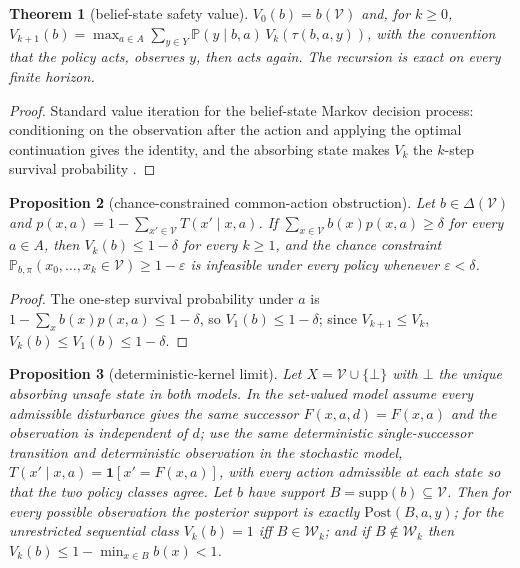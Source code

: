 \documentclass[11pt,a4paper]{article}
\theoremstyle{plain}
\newtheorem{theorem}{Theorem}[section]
\newtheorem{proposition}[theorem]{Proposition}
\theoremstyle{definition}
\theoremstyle{remark}
\newcommand{\cV}{\mathcal{V}}
\newcommand{\cW}{\mathcal{W}}
\newcommand{\Post}{\mathrm{Post}}
\newcommand{\supp}{\mathrm{supp}}
\begin{document}
\begin{theorem}[belief-state safety value]\label{thm:pomdp}
$V_0(b)=b(\cV)$ and, for $k\ge0$, $V_{k+1}(b)=\max_{a\in A}\sum_{y\in Y}\mathbb P(y\mid b,a)\,V_k(\tau(b,a,y))$, with the convention that the policy acts, observes $y$, then acts again. The recursion is exact on every finite horizon.
\end{theorem}

\begin{proof}
Standard value iteration for the belief-state Markov decision process: conditioning on the observation after the action and applying the optimal continuation gives the identity, and the absorbing state makes $V_k$ the $k$-step survival probability \citep{smallwood1973}.
\end{proof}

\begin{proposition}[chance-constrained common-action obstruction]\label{prop:chance}
Let $b\in\Delta(\cV)$ and $p(x,a)=1-\sum_{x'\in\cV}T(x'\mid x,a)$. If $\sum_{x\in\cV}b(x)p(x,a)\ge\delta$ for every $a\in A$, then $V_k(b)\le1-\delta$ for every $k\ge1$, and the chance constraint $\mathbb P_{b,\pi}(x_0,\dots,x_k\in\cV)\ge1-\varepsilon$ is infeasible under every policy whenever $\varepsilon<\delta$.
\end{proposition}

\begin{proof}
The one-step survival probability under $a$ is $1-\sum_xb(x)p(x,a)\le1-\delta$, so $V_1(b)\le1-\delta$; since $V_{k+1}\le V_k$, $V_k(b)\le V_1(b)\le1-\delta$.
\end{proof}

\begin{proposition}[deterministic-kernel limit]\label{prop:degenerate}
Let $X=\cV\cup\{\bot\}$ with $\bot$ the unique absorbing unsafe state in both models. In the set-valued model assume every admissible disturbance gives the same successor $F(x,a,d)=F(x,a)$ and the observation is independent of $d$; use the same deterministic single-successor transition and deterministic observation in the stochastic model, $T(x'\mid x,a)=\mathbf 1[x'=F(x,a)]$, with every action admissible at each state so that the two policy classes agree. Let $b$ have support $B=\supp(b)\subseteq\cV$. Then for every possible observation the posterior support is exactly $\Post(B,a,y)$; for the unrestricted sequential class $V_k(b)=1$ iff $B\in\cW_k$; and if $B\notin\cW_k$ then $V_k(b)\le1-\min_{x\in B}b(x)<1$.
\end{proposition}
\end{document}
